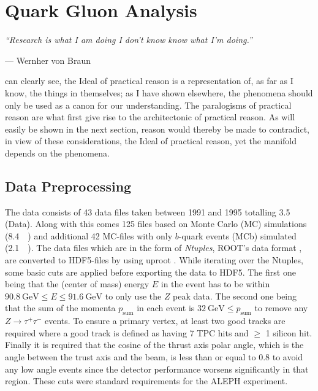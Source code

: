 
\chapter{Quark Gluon Analysis}
\label{ch:quark_gluon_analysis}
\epigraph{\textit{``Research is what I am doing I don't know know what I'm doing.''}}{---  Wernher von Braun}


 can clearly see, the Ideal of practical reason is a representation of, as far as I know, the things in themselves; as I have shown elsewhere, the phenomena should only be used as a canon for our understanding. The paralogisms of practical reason are what first give rise to the architectonic of practical reason. As will easily be shown in the next section, reason would thereby be made to contradict, in view of these considerations, the Ideal of practical reason, yet the manifold depends on the phenomena.


\section{Data Preprocessing}
\label{sec:q:data_preprocessing}

The data consists of \num{43} data files taken between \num{1991} and \num{1995} totalling \SI{3.5}{\giga\byte} (Data). Along with this comes \num{125} files based on Monte Carlo (MC) simulations (\SI{8.4}{\giga\byte}) and additional \num{42} MC-files with only $b$-quark events (MCb) simulated (\SI{2.1}{\giga\byte}). The data files which are in the form of \emph{Ntuples}, ROOT's data format \autocite{brunROOTObjectOriented1997}, are converted to HDF5-files by using uproot \autocite{ScikithepUproot2019}. While iterating over the Ntuples, some basic cuts are applied before exporting the data to HDF5. The first one being that the (center of mass) energy $E$ in the event has to be within $\SI{90.8}{\GeV} \leq E \leq \SI{91.6}{\GeV}$ to only use the $Z$ peak data. The second one being that the sum of the momenta $p_\mathrm{sum}$ in each event is $\SI{32}{\GeV} \leq p_\mathrm{sum}$ to remove any $Z \rightarrow \tau^+ \tau^-$ events. To ensure a primary vertex, at least two good tracks are required where a good track is defined as having \num{7} TPC hits and $\geq$ 1 silicon hit. Finally it is required that the cosine of the thrust axis polar angle, which is the angle between the trust axis and the beam, is less than or equal to \num{0.8} to avoid any low angle events since the detector performance worsens significantly in that region. These cuts were standard requirements for the ALEPH experiment.

